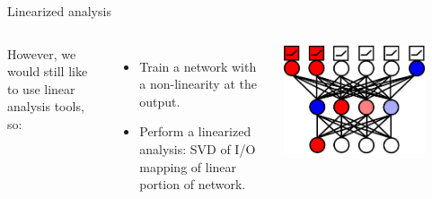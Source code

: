 \documentclass{beamer}
\begin{document}
\begin{frame}{Linearized analysis}
\begin{columns}
	However, we would still like to use linear analysis tools, so:
	\begin{itemize}
	    \item<2-> Train a network with a non-linearity at the output.
	    \item<3-> Perform a linearized analysis: SVD of I/O mapping of linear portion of network. 
	\end{itemize}
	\begin{center}
	    \includegraphics[width=0.8\textwidth]{../writing/cogsci_2017/figures/network_diagram.png}
	\end{center}
\end{columns}
\end{frame}
\end{document}
